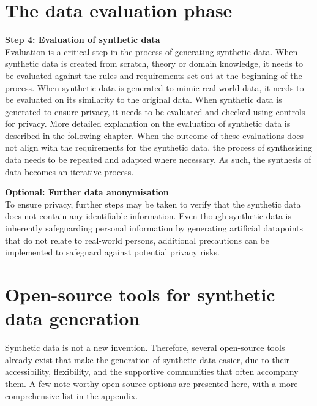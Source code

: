 
\section{The data evaluation phase}

\textbf{Step 4: Evaluation of synthetic data} \\
Evaluation is a critical step in the process of generating synthetic data. When synthetic data is created from scratch, theory or domain knowledge, it needs to be evaluated against the rules and requirements set out at the beginning of the process. When synthetic data is generated to mimic real-world data, it needs to be evaluated on its similarity to the original data. When synthetic data is generated to ensure privacy, it needs to be evaluated and checked using controls for privacy. More detailed explanation on the evaluation of synthetic data is described in the following chapter. When the outcome of these evaluations does not align with the requirements for the synthetic data, the process of synthesising data needs to be repeated and adapted where necessary. As such, the synthesis of data becomes an iterative process.


\textbf{Optional: Further data anonymisation} \\
To ensure privacy, further steps may be taken to verify that the synthetic data does not contain any identifiable information. Even though synthetic data is inherently safeguarding personal information by generating artificial datapoints that do not relate to real-world persons, additional precautions can be implemented to safeguard against potential privacy risks. 




\section{Open-source tools for synthetic data generation}

Synthetic data is not a new invention. Therefore, several open-source tools already exist that make the generation of synthetic data easier, due to their accessibility, flexibility, and the supportive communities that often accompany them. A few note-worthy open-source options are presented here, with a more comprehensive list in the appendix.

